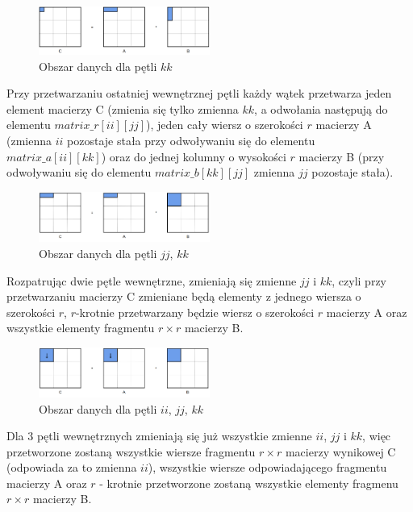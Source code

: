 \documentclass[10pt,a4paper]{article}
\begin{document}
\begin{figure}[h]
	\centering
	\includegraphics[width=0.5\textwidth]{6loops1.png}
	\caption{Obszar danych dla pętli $kk$}
\end{figure}

Przy przetwarzaniu ostatniej wewnętrznej pętli każdy wątek przetwarza jeden element macierzy C (zmienia się tylko zmienna $kk$, a odwołania następują do 
elementu $matrix\_r[ii][jj]$), jeden cały wiersz o szerokości $r$ macierzy A (zmienna $ii$ pozostaje stała przy odwoływaniu się do elementu $matrix\_a[ii][kk]$) oraz 
do jednej kolumny o wysokości $r$ macierzy B (przy odwoływaniu się do elementu $matrix\_b[kk][jj]$ zmienna $jj$ pozostaje stała).

\begin{figure}[h]
	\centering
	\includegraphics[width=0.5\textwidth]{6loops2.png}
	\caption{Obszar danych dla pętli $jj$, $kk$}
\end{figure}

Rozpatrując dwie pętle wewnętrzne, zmieniają się zmienne $jj$ i $kk$, czyli przy przetwarzaniu macierzy C zmieniane będą elementy z jednego wiersza 
o szerokości $r$, $r$-krotnie przetwarzany będzie wiersz o szerokości $r$ macierzy A oraz wszystkie elementy fragmentu $r \times r$ macierzy B. 

\begin{figure}[h]
	\centering
	\includegraphics[width=0.5\textwidth]{6loops3.png}
	\caption{Obszar danych dla pętli $ii$, $jj$, $kk$}
\end{figure}

Dla 3 pętli wewnętrznych zmieniają się już wszystkie zmienne $ii$, $jj$ i $kk$, więc przetworzone zostaną wszystkie wiersze fragmentu $r \times r$
macierzy wynikowej C (odpowiada za to zmienna $ii$), wszystkie wiersze odpowiadającego fragmentu macierzy A oraz $r$ - krotnie przetworzone zostaną 
wszystkie elementy fragmenu $r \times r$ macierzy B. \\
\end{document}
